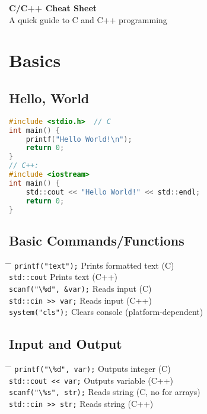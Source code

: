 \documentclass[a4paper,10pt]{article}
\begin{document}
\begin{center}
	{\LARGE \textbf{C/C++ Cheat Sheet}} \\[1em]
	{\large A quick guide to C and C++ programming}
\end{center}

\vspace{0.5cm}

\section{Basics}
\subsection{Hello, World}
\begin{lstlisting}[language=C]
#include <stdio.h>  // C
int main() {
    printf("Hello World!\n");
    return 0;
}
// C++:
#include <iostream>
int main() {
    std::cout << "Hello World!" << std::endl;
    return 0;
}
\end{lstlisting}

\subsection{Basic Commands/Functions}
\begin{tabbing}
	\= \hspace{30mm} \= \hspace{50mm} \kill
	\> \verb|printf("text");| \> Prints formatted text (C) \\
	\> \verb|std::cout| \> Prints text (C++) \\
	\> \verb|scanf("\%d", &var);| \> Reads input (C) \\
	\> \verb|std::cin >> var;| \> Reads input (C++) \\
	\> \verb|system("cls");| \> Clears console (platform-dependent) \\
\end{tabbing}

\subsection{Input and Output}
\begin{tabbing}
	\= \hspace{30mm} \= \hspace{50mm} \kill
	\> \verb|printf("\%d", var);| \> Outputs integer (C) \\
	\> \verb|std::cout << var;| \> Outputs variable (C++) \\
	\> \verb|scanf("\%s", str);| \> Reads string (C, no for arrays) \\
	\> \verb|std::cin >> str;| \> Reads string (C++) \\
\end{tabbing}
\end{document}
